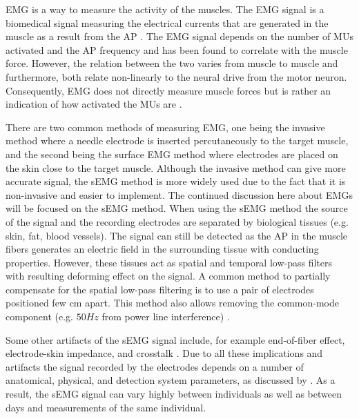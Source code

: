 \documentclass[../main.tex]{subfiles}
\begin{document}
\Ac{EMG} is a way to measure the activity of the muscles.
The \ac{EMG} signal is a biomedical signal measuring the electrical currents that are generated in the muscle as a result from the \ac{AP} \cite{Raez2006}.
The \ac{EMG} signal depends on the number of \acp{MU} activated and the \ac{AP} frequency and has been found to correlate with the muscle force.
However, the relation between the two varies from muscle to muscle and furthermore, both relate non-linearly to the neural drive from the motor neuron.
Consequently, \ac{EMG} does not directly measure muscle forces but is rather an indication of how activated the \acp{MU} are \cite{Enoka2016, Farina2016}.

There are two common methods of measuring \ac{EMG}, one being the invasive method where a needle electrode is inserted percutaneously to the target muscle, and the second being the surface \ac{EMG} method where electrodes are placed on the skin close to the target muscle. 
Although the invasive method can give more accurate signal, the \ac{sEMG} method is more widely used due to the fact that it is non-invasive and easier to implement. 
The continued discussion here about \ac{EMG}s will be focused on the \ac{sEMG} method.
When using the \ac{sEMG} method the source of the signal and the recording electrodes are separated by biological tissues (e.g. skin, fat, blood vessels).
The signal can still be detected as the \ac{AP} in the muscle fibers generates an electric field in the surrounding tissue with conducting properties.
However, these tissues act as spatial and temporal low-pass filters with resulting deforming effect on the signal.
A common method to partially compensate for the spatial low-pass filtering is to use a pair of electrodes positioned few cm apart.
This method also allows removing the common-mode component (e.g. $50Hz$ from power line interference) \cite{Farina2016}.

Some other artifacts of the \ac{sEMG} signal include, for example end-of-fiber effect, electrode-skin impedance, and crosstalk \cite{Farina2016}.
Due to all these implications and artifacts the signal recorded by the electrodes depends on a number of anatomical, physical, and detection system parameters, as discussed by \textcite[p. 41]{Farina2016}. 
As a result, the \ac{sEMG} signal can vary highly between individuals as well as between days and measurements of the same individual.
\end{document}
